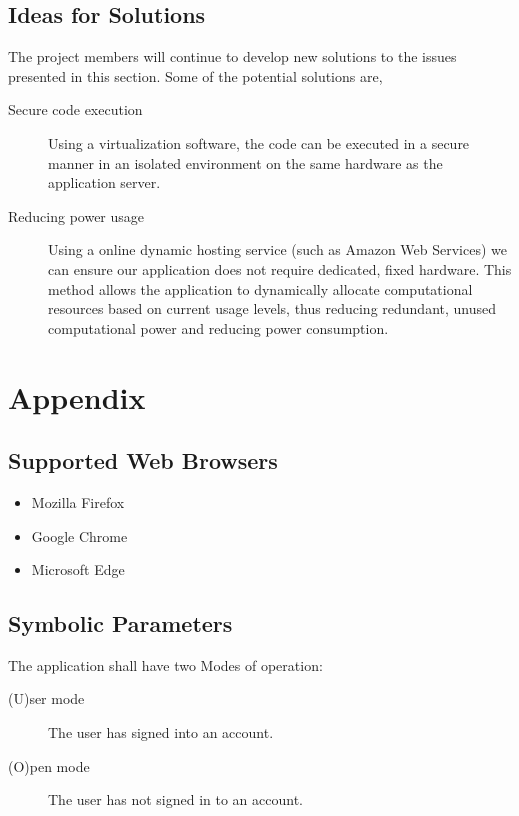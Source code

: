 \documentclass[12pt, titlepage]{article}
\begin{document}
  \subsection{Ideas for Solutions}
	The project members will continue to develop new solutions to the issues
	presented in this section. Some of the potential solutions are,
	\begin{description}
		\item [Secure code execution] Using a virtualization software, the code can
			be executed in a secure manner in an isolated environment on the same
			hardware as the application server.
		\item [Reducing power usage] Using a online dynamic hosting service (such
			as Amazon Web Services) we can ensure our application does not require
			dedicated, fixed hardware. This method allows the application to
			dynamically allocate computational resources based on current usage
			levels, thus reducing redundant, unused computational power and reducing
			power consumption.
	\end{description}





\newpage

\section{Appendix}

\subsection{Supported Web Browsers}
\begin{itemize}
	\item Mozilla Firefox
	\item Google Chrome
	\item Microsoft Edge
\end{itemize}

\subsection{Symbolic Parameters}
The application shall have two Modes of operation:
\begin{description}
	\item [(U)ser mode] The user has signed into an account.
	\item [(O)pen mode] The user has not signed in to an account.
\end{description}
\end{document}
